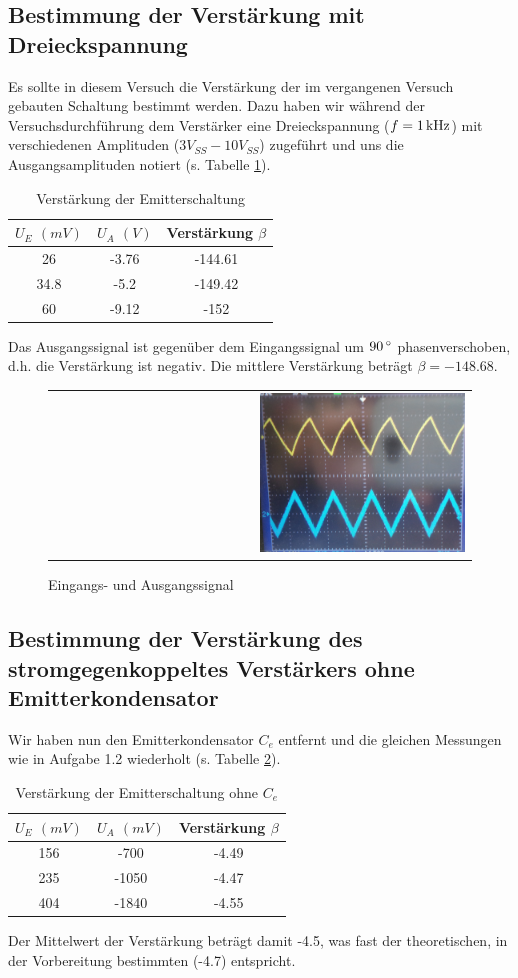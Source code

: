 \documentclass[a4paper,titlepage]{scrartcl}
\numberwithin{equation}{section}
\begin{document}
\subsection{Bestimmung der Verstärkung mit Dreieckspannung}
Es sollte in diesem Versuch die Verstärkung der im vergangenen Versuch gebauten Schaltung bestimmt werden. Dazu haben wir während der Versuchsdurchführung dem Verstärker eine Dreieckspannung ($f=\unit[1]{kHz}$) mit verschiedenen Amplituden ($3 V_{SS}- 10 V_{SS}$) zugeführt und uns die Ausgangsamplituden notiert (s. Tabelle \ref{tab:aufgabe12}).
\begin{table}[H]
\begin{tabular}{c|c|c}
	$U_E$ $(mV)$ & $U_A$ $(V)$ & Verstärkung $\beta$ \\
	\hline
	26 & -3.76 & -144.61 \\
	34.8 & -5.2 & -149.42 \\
	60 & -9.12 & -152 \\
\end{tabular}
\caption{Verstärkung der Emitterschaltung}
\label{tab:aufgabe12}
\end{table}
Das Ausgangssignal ist gegenüber dem Eingangssignal um $\unit[90]{^\circ}$ phasenverschoben, d.h. die Verstärkung ist negativ. Die mittlere Verstärkung beträgt $\beta=-148.68$.
\begin{figure}[H]
	\centering
	\begin{tabular}{@{}r@{}}
		\includegraphics[width=0.5\textwidth]{bilder/aufgabe12.jpg}\\
	\end{tabular}
	\caption{Eingangs- und Ausgangssignal}
	\label{fig:aufgabe12}
\end{figure}
\subsection{Bestimmung der Verstärkung des stromgegenkoppeltes Verstärkers ohne Emitterkondensator}
Wir haben nun den Emitterkondensator $C_e$ entfernt und die gleichen Messungen wie in Aufgabe 1.2 wiederholt (s. Tabelle \ref{tab:aufgabe13}).
\begin{table}[H]
\begin{tabular}{c|c|c}
	$U_E$ $(mV)$ & $U_A$ $(mV)$ & Verstärkung $\beta$ \\
	\hline
	156 & -700 & -4.49 \\
	235 & -1050 & -4.47 \\
	404 & -1840 & -4.55 \\
\end{tabular}
\caption{Verstärkung der Emitterschaltung ohne $C_e$}
\label{tab:aufgabe13}
\end{table}
Der Mittelwert der Verstärkung beträgt damit -4.5, was fast der theoretischen, in der Vorbereitung bestimmten (-4.7) entspricht.
\end{document}
